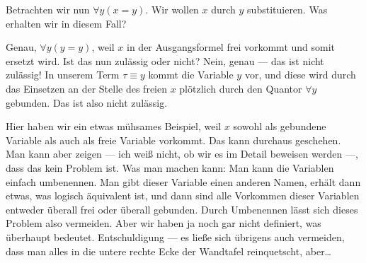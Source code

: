 \begin{spoken-clean}[01:17:37 - 01:19:22]
Betrachten wir nun $\forall y (x = y)$. Wir wollen $x$ durch $y$ substituieren. Was erhalten wir in diesem Fall?

Genau, $\forall y (y = y)$, weil $x$ in der Ausgangsformel frei vorkommt und somit ersetzt wird. Ist das nun zulässig oder nicht? Nein, genau --- das ist nicht zulässig! In unserem Term $\tau \equiv y$ kommt die Variable $y$ vor, und diese wird durch das Einsetzen an der Stelle des freien $x$ plötzlich durch den Quantor $\forall y$ gebunden. Das ist also nicht zulässig.

Hier haben wir ein etwas mühsames Beispiel, weil $x$ sowohl als gebundene Variable als auch als freie Variable vorkommt. Das kann durchaus geschehen. Man kann aber zeigen --- ich weiß nicht, ob wir es im Detail beweisen werden ---, dass das kein Problem ist. Was man machen kann: Man kann die Variablen einfach umbenennen. Man gibt dieser Variable einen anderen Namen, erhält dann etwas, was logisch äquivalent ist, und dann sind alle Vorkommen dieser Variablen entweder überall frei oder überall gebunden. Durch Umbenennen lässt sich dieses Problem also vermeiden. Aber wir haben ja noch gar nicht definiert, was  überhaupt bedeutet. Entschuldigung --- es ließe sich übrigens auch vermeiden, dass man alles in die untere rechte Ecke der Wandtafel reinquetscht, aber\dots
\end{spoken-clean}

\begin{math-stroke}
\end{math-stroke}

